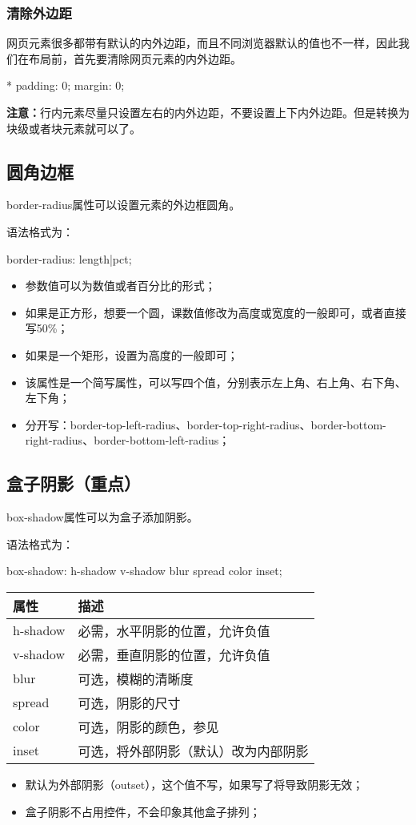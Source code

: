 \subsubsection{清除外边距}
网页元素很多都带有默认的内外边距，而且不同浏览器默认的值也不一样，因此我们在布局前，首先要清除网页元素的内外边距。

\begin{css}
* {
    padding: 0;
    margin: 0;
}
\end{css}

\textbf{注意：}行内元素尽量只设置左右的内外边距，不要设置上下内外边距。但是转换为块级或者块元素就可以了。
\subsection{圆角边框}
border-radius属性可以设置元素的外边框圆角。

语法格式为：
\begin{css}
border-radius: length|pct;
\end{css}
\begin{itemize}
    \item 参数值可以为数值或者百分比的形式；
    \item 如果是正方形，想要一个圆，课数值修改为高度或宽度的一般即可，或者直接写50\%；
    \item 如果是一个矩形，设置为高度的一般即可；
    \item 该属性是一个简写属性，可以写四个值，分别表示左上角、右上角、右下角、左下角；
    \item 分开写：border-top-left-radius、border-top-right-radius、border-bottom-right-radius、border-bottom-left-radius；
\end{itemize}
\subsection{盒子阴影（重点）}
box-shadow属性可以为盒子添加阴影。

语法格式为：
\begin{css}
box-shadow: h-shadow v-shadow blur spread color inset;
\end{css}
\begin{table}[H]
    \centering
    \begin{tabular}{ll}
        \hline
        属性&描述\\
        \hline
        h-shadow&必需，水平阴影的位置，允许负值\\
        v-shadow&必需，垂直阴影的位置，允许负值\\
        blur&可选，模糊的清晰度\\
        spread&可选，阴影的尺寸\\
        color&可选，阴影的颜色，参见\nameref{CCS color}\\
        inset&可选，将外部阴影（默认）改为内部阴影\\
        \hline
    \end{tabular}
\end{table}
\begin{itemize}
    \item 默认为外部阴影（outset），这个值不写，如果写了将导致阴影无效；
    \item 盒子阴影不占用控件，不会印象其他盒子排列；
\end{itemize}
